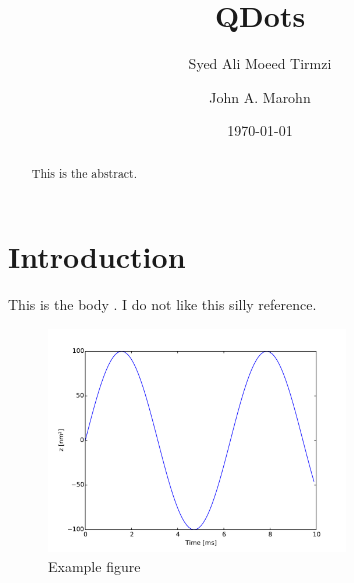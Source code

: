 \documentclass[aps,prl,twocolumn,citeautoscript,superscriptaddress,byrevtex,nofootinbib,nobalancelastpage,floatfix]{revtex4}
\begin{document}
    \pagestyle{fancy}

        \rhead{\footnotesize \textsf{\today}}
        \lfoot{}
        \cfoot{\thepage}
        \rfoot{}


    \title{QDots}

    \author{Syed Ali Moeed Tirmzi}

    \author{John A. Marohn}


\begin{abstract}
    This is the abstract.
\end{abstract}

\date{\today}

\maketitle
\thispagestyle{fancy}


\section{Introduction}
This is the body \cite{Somebody1900}.  I do not like this silly reference.

\begin{figure}
    \label{fig:Example}
    \includegraphics[width=3.1in]{figs/ex.pdf}
    \caption{Example figure}
\end{figure}


\def\bibsection{\vspace{6pt}}
\setlength{\bibsep}{0pt}




\label{TheEnd}
\end{document}
